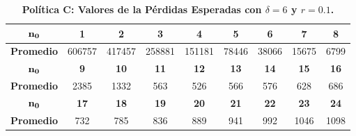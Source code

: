 \begin{table}[h!]\small
\centering
\caption{\bf Pol\'itica C: Valores de la P\'erdidas Esperadas con $\delta=6$ y $r=0.1$.}\label{u36t}
\begin{tabular}{ccccccccc}
\toprule[0.6mm]
$\bf{n_0}$&\bf{1} &                   \bf{2} &                   \bf{3} &                   \bf{ 4 }&                    \bf{ 5}&              \bf{ 6} &               \bf{ 7} & \bf{8} \\
\hline
{\bf Promedio}& 606757 & 417457 &258881& 151181 & 78446 & 38066 & 15675&  6799  \\
\hline
$\bf{n_0}$&\bf{9} &                \bf{ 10}&              \bf{      11} &                   \bf{ 12} &               \bf{      13}&              \bf{14} &  \bf{ 15} & \bf{16 }   \\
\hline
{\bf Promedio}&	    2385 &  1332&   563 &   526 &   566 &   576&  628  &  686   \\
	 \hline
	
$\bf{n_0}$&\bf{17} &     \bf{ 18}&   \bf{19}&   \bf{ 20} &           \bf{   21}&                \bf{  22}  & \bf{23} &  \bf{24}\\
\hline
{\bf Promedio}&   732  &  785 &  836&   889  &  941&  992 &  1046 &  1098\\
 \toprule[0.6mm]
\end{tabular}

\end{table}



